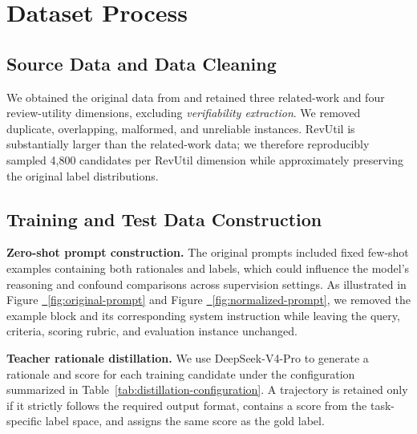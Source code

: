 \section{Dataset Process}
\label{app:dataset-process}

\subsection{Source Data and Data Cleaning}

We obtained the original data from \citet{sahinuc-etal-2026-reward} and retained 
three related-work and four review-utility dimensions, excluding 
\textit{verifiability extraction}. We removed duplicate, overlapping, malformed, 
and unreliable instances. RevUtil is substantially larger than
the related-work data; we therefore reproducibly
sampled 4,800 candidates per RevUtil dimension while approximately preserving
the original label distributions.

\subsection{Training and Test Data Construction}

\noindent\textbf{Zero-shot prompt construction.}
The original prompts included fixed few-shot examples containing both
rationales and labels, which could influence the model's reasoning and
confound comparisons across supervision settings. As illustrated in Figure
\hyperref[fig:original-prompt]{~\ref*{fig:original-prompt}} and Figure
\hyperref[fig:normalized-prompt]{~\ref*{fig:normalized-prompt}}, we
removed the example block and its corresponding system instruction while
leaving the query, criteria, scoring rubric, and evaluation instance
unchanged.

\noindent\textbf{Teacher rationale distillation.}
We use DeepSeek-V4-Pro to generate a rationale and score for each training
candidate under the configuration summarized in
Table~\ref{tab:distillation-configuration}. A trajectory is retained only if
it strictly follows the required output format, contains a score from the
task-specific label space, and assigns the same score as the gold label.

